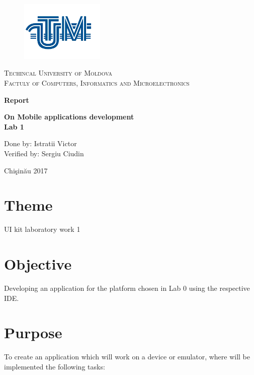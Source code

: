 \documentclass[12pt]{article}
\begin{document}
    \begin{titlepage}
        \centering
        \begin{figure}[t]
        \centering
        \includegraphics[width=4cm]{utm2.png}
        \end{figure}
        { \scshape\Large Techincal University of Moldova \\ Factuly of Computers, Informatics and Microelectronics \par }
        
        \vspace{5cm}
        { \Huge\bfseries Report \par }
        { \Large\bfseries On Mobile applications development \\ }
        { \Large\bfseries Lab 1 }

        \vspace{5cm}
        \begin{flushright}
            Done by: Istratii Victor \\
            Verified by: Sergiu Ciudin
        \end{flushright}

        \vfill

        Chişinău 2017
        
    \end{titlepage}


    \newpage

    \section*{Theme}
        UI kit laboratory work 1

    \section*{Objective}
        Developing an application for the platform chosen in Lab 0 using the respective IDE.

    \section*{Purpose}
        To create an application which will work on a device or emulator, where will be implemented the following tasks:
\end{document}
